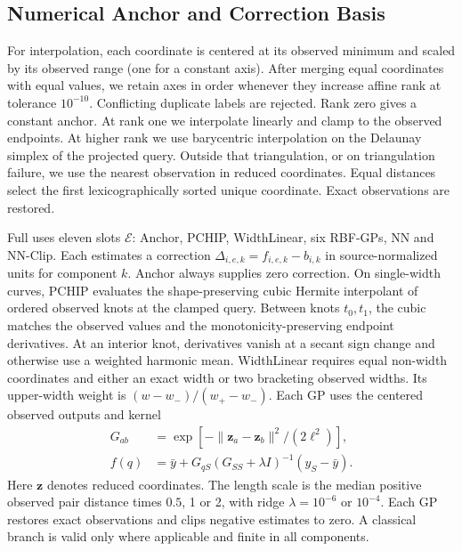 \subsection{Numerical Anchor and Correction Basis}
For interpolation, each coordinate is centered at its observed minimum and scaled by its observed range (one for a constant axis). After merging equal coordinates with equal values, we retain axes in order whenever they increase affine rank at tolerance $10^{-10}$. Conflicting duplicate labels are rejected. Rank zero gives a constant anchor. At rank one we interpolate linearly and clamp to the observed endpoints. At higher rank we use barycentric interpolation on the Delaunay simplex of the projected query. Outside that triangulation, or on triangulation failure, we use the nearest observation in reduced coordinates. Equal distances select the first lexicographically sorted unique coordinate. Exact observations are restored.

Full uses eleven slots $\mathcal E$: Anchor, PCHIP, WidthLinear, six RBF-GPs, NN and NN-Clip. Each estimates a correction $\Delta_{i,e,k}=f_{i,e,k}-b_{i,k}$ in source-normalized units for component $k$. Anchor always supplies zero correction. On single-width curves, PCHIP evaluates the shape-preserving cubic Hermite interpolant of ordered observed knots at the clamped query. Between knots $t_0,t_1$, the cubic matches the observed values and the monotonicity-preserving endpoint derivatives. At an interior knot, derivatives vanish at a secant sign change and otherwise use a weighted harmonic mean. WidthLinear requires equal non-width coordinates and either an exact width or two bracketing observed widths. Its upper-width weight is $(w-w_-)/(w_+-w_-)$. Each GP uses the centered observed outputs and kernel
\begin{equation}
\begin{aligned}G_{ab}&=\exp[-\|\mathbf z_a-\mathbf z_b\|^2/(2\ell^2)],\\
f(q)&=\bar y+G_{qS}(G_{SS}+\lambda I)^{-1}(y_S-\bar y).\end{aligned}
\end{equation}
Here $\mathbf z$ denotes reduced coordinates. The length scale is the median positive observed pair distance times $0.5$, 1 or 2, with ridge $\lambda=10^{-6}$ or $10^{-4}$. Each GP restores exact observations and clips negative estimates to zero. A classical branch is valid only where applicable and finite in all components.

